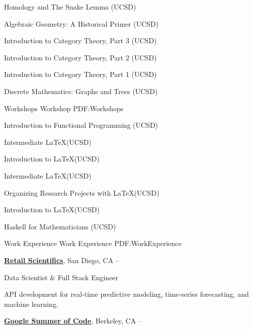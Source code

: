 \documentclass[letterpaper,MMMyyyy,nonstopmode]{simpleresumecv}
\begin{document}
\begin{Body}
\BulletItem
Homology and The Snake Lemma (UCSD)
\hfill {}

\BulletItem
Algebraic Geometry: A Historical Primer (UCSD)
\hfill {}

\BulletItem
Introduction to Category Theory, Part 3 (UCSD)
\hfill {}

\BulletItem
Introduction to Category Theory, Part 2 (UCSD)
\hfill {}

\BulletItem
Introduction to Category Theory, Part 1 (UCSD)
\hfill {}

\BulletItem
Discrete Mathematics: Graphs and Trees (UCSD)
\hfill {}

\Section
{Workshops}
{Workshop}
{PDF:Workshops}

\BulletItem
Introduction to Functional Programming (UCSD)
\hfill {}

\BulletItem
Intermediate \LaTeX (UCSD)
\hfill {}

\BulletItem
Introduction to \LaTeX (UCSD)
\hfill {}

\BulletItem
Intermediate \LaTeX (UCSD)
\hfill {}

\BulletItem
Organizing Research Projects with \LaTeX (UCSD)
\hfill {}

\BulletItem
Introduction to \LaTeX (UCSD)
\hfill {}

\BulletItem
Haskell for Mathematicians (UCSD)
\hfill {}




\Section
{Work Experience}
{Work Experience}
{PDF:WorkExperience}

\Entry
\href{https://www.retailscientifics.com/}
{\textbf{Retail Scientifics}},
San Diego, CA
\hfill
{} --

\Gap
\BulletItem
Data Scientist \& Full Stack Engineer

\begin{Detail}
\SubBulletItem
API development for real-time predictive modeling, time-series forecasting, and machine learning.
\end{Detail}

\BigGap
\Entry
\href{https://summerofcode.withgoogle.com/archive/}
{\textbf{Google Summer of Code}},
Berkeley, CA
\hfill
{} --


\end{Body}
\end{document}
